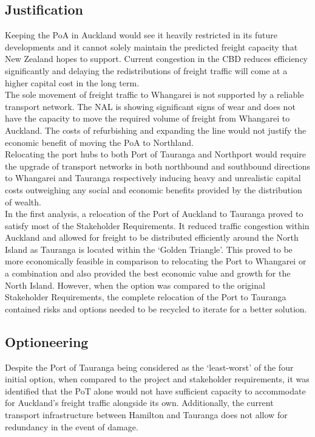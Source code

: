 \subsection*{Justification}
Keeping the PoA in Auckland would see it heavily restricted in its future developments and it cannot solely maintain the predicted freight capacity that New Zealand hopes to support. Current congestion in the CBD reduces efficiency significantly and delaying the redistributions of freight traffic will come at a higher capital cost in the long term. 
\\The sole movement of freight traffic to Whangarei is not supported by a reliable transport network. The NAL is showing significant signs of wear and does not have the capacity to move the required volume of freight from Whangarei to Auckland. The costs of refurbishing and expanding the line would not justify the economic benefit of moving the PoA to Northland. 
\\Relocating the port hubs to both Port of Tauranga and Northport would require the upgrade of transport networks in both northbound and southbound directions to Whangarei and Tauranga respectively inducing heavy and unrealistic capital costs outweighing any social and economic benefits provided by the distribution of wealth.
\\In the first analysis, a relocation of the Port of Auckland to Tauranga proved to satisfy most of the Stakeholder Requirements. It reduced traffic congestion within Auckland and allowed for freight to be distributed efficiently around the North Island as Tauranga is located within the ‘Golden Triangle’. This proved to be more economically feasible in comparison to relocating the Port to Whangarei or a combination and also provided the best economic value and growth for the North Island. However, when the option was compared to the original Stakeholder Requirements, the complete relocation of the Port to Tauranga contained risks and options needed to be recycled to iterate for a better solution.
\subsection*{Optioneering}
Despite the Port of Tauranga being considered as the ‘least-worst’ of the four initial option, when compared to the project and stakeholder requirements, it was identified that the PoT alone would not have sufficient capacity to accommodate for Auckland’s freight traffic alongside its own. Additionally, the current transport infrastructure between Hamilton and Tauranga does not allow for redundancy in the event of damage.
